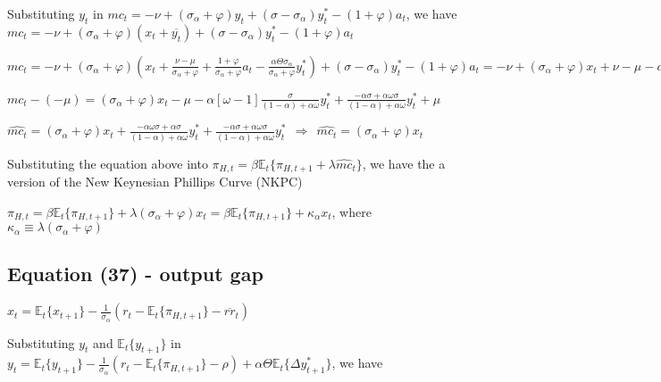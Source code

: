 \documentclass[
]{article}
\begin{document}
Substituting \(y_t\) in
\(mc_t = -\nu + (\sigma_\alpha+\varphi)y_t + (\sigma-\sigma_\alpha)y_t^*-(1+\varphi)a_t\),
we have
\(mc_t = -\nu + (\sigma_\alpha+\varphi)(x_t+\overline{y_t}) + (\sigma-\sigma_\alpha)y_t^*-(1+\varphi)a_t\)

\(\displaystyle mc_t = -\nu + (\sigma_\alpha+\varphi)\left(x_t+\frac{\nu -\mu}{\sigma_\alpha+\varphi} + \frac{1+\varphi}{\sigma_\alpha+\varphi}a_t - \frac{ \alpha \Theta \sigma_\alpha}{\sigma_\alpha+\varphi}y_t^* \right) + (\sigma-\sigma_\alpha)y_t^*-(1+\varphi)a_t = -\nu + (\sigma_\alpha+\varphi)x_t + \nu - \mu - \alpha \Theta \sigma_\alpha y_t^* + (\sigma-\sigma_\alpha)y_t^*\)

\(\displaystyle mc_t-(-\mu)=(\sigma_\alpha+\varphi)x_t - \mu - \alpha \left[ \omega-1 \right] \frac{\sigma}{(1-\alpha)+\alpha \omega} y_t^* + \frac{-\alpha \sigma +\alpha \omega\sigma}{(1-\alpha)+\alpha \omega} y_t^* + \mu\)

\(\displaystyle \widehat{mc_t}=(\sigma_\alpha+\varphi)x_t + \frac{-\alpha \omega \sigma + \alpha \sigma}{(1-\alpha)+\alpha \omega} y_t^* + \frac{-\alpha \sigma +\alpha \omega\sigma}{(1-\alpha)+\alpha \omega} y_t^* \ \ \Rightarrow \ \ \widehat{mc_t}=(\sigma_\alpha+\varphi)x_t\)

Substituting the equation above into
\(\pi_{H,t} = \beta \mathbb{E}_t \{ \pi_{H,t+1} + \lambda \widehat{mc}_t\}\),
we have the a version of the New Keynesian Phillips Curve (NKPC)

\(\pi_{H,t} = \beta \mathbb{E}_t \{ \pi_{H,t+1}\} + \lambda (\sigma_\alpha+\varphi)x_t = \beta \mathbb{E}_t \{ \pi_{H,t+1}\} + \kappa_\alpha x_t\),
where \(\kappa_\alpha \equiv \lambda (\sigma_\alpha+\varphi)\)

\vspace{12pt}

\hypertarget{equation-37---output-gap}{%
\subsection{Equation (37) - output gap}\label{equation-37---output-gap}}

\(\displaystyle x_t = \mathbb{E}_t\{x_{t+1}\} -\frac{1}{\sigma_\alpha}(r_t-\mathbb{E}_t\{\pi_{H,t+1}\} -\overline{rr}_t)\)

\vspace{8pt}

Substituting \(y_t\) and \(\mathbb{E}_t\{y_{t+1}\}\) in
\(\displaystyle y_t= \mathbb{E}_t\{y_{t+1}\} -\frac{1}{\sigma_\alpha}(r_t-\mathbb{E}_t\{\pi_{H,t+1}\} -\rho)+ \alpha \Theta \mathbb{E}_t\{\Delta y_{t+1}^*\}\),
we have
\end{document}
